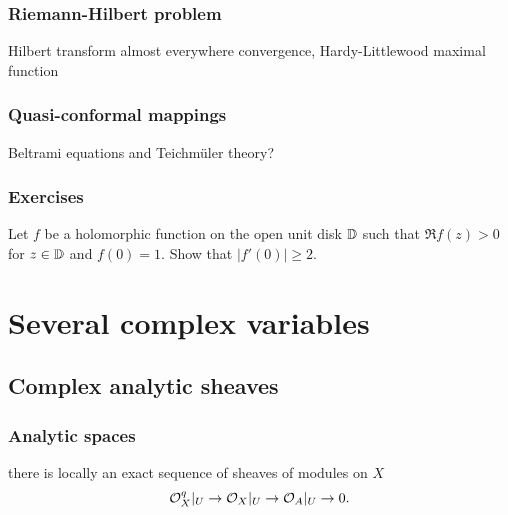 \documentclass{../../large}
\begin{document}
\section{Riemann-Hilbert problem}
Hilbert transform
almost everywhere convergence, Hardy-Littlewood maximal function

\section{Quasi-conformal mappings}
Beltrami equations and Teichm\"uler theory?

\section{Exercises}
\begin{prb}
Let $f$ be a holomorphic function on the open unit disk $\mathbb{D}$ such that $\Re f(z)>0$ for $z\in\mathbb{D}$ and $f(0)=1$. Show that $|f'(0)|\ge2$.
\end{prb}






\chapter{}






\part{Several complex variables}

\chapter{Complex analytic sheaves}


\section{Analytic spaces}



there is locally an exact sequence of sheaves of modules on $X$
\[\mathcal{O}_X^q|_U\to\mathcal{O}_X|_U\to\mathcal{O}_A|_U\to0.\]
\end{document}
